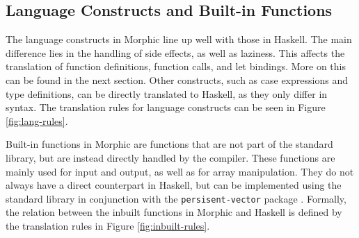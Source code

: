 \documentclass[a4paper,UKenglish,cleveref, autoref, thm-restate]{template/lipics-v2021}
\begin{document}
\subsection{Language Constructs and Built-in Functions}
The language constructs in Morphic line up well with those in Haskell. The main difference lies in the handling of side effects, as well as laziness. This affects the translation of function definitions, function calls, and let bindings. More on this can be found in the next section. Other constructs, such as case expressions and type definitions, can be directly translated to Haskell, as they only differ in syntax. The translation rules for language constructs can be seen in Figure \ref{fig:lang-rules}.

Built-in functions in Morphic are functions that are not part of the standard library, but are instead directly handled by the compiler. These functions are mainly used for input and output, as well as for array manipulation. They do not always have a direct counterpart in Haskell, but can be implemented using the standard library in conjunction with the \verb|persisent-vector| package \cite{Ravitch}. Formally, the relation between the inbuilt functions in Morphic and Haskell is defined by the translation rules in Figure \ref{fig:inbuilt-rules}.
\end{document}
